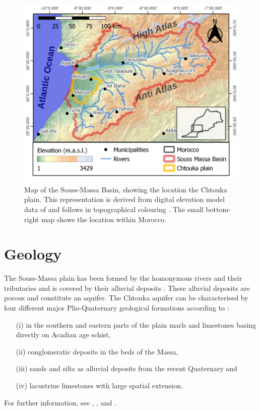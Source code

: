 \begin{figure}[p]
    \centering
    \includegraphics[width=1.0\textwidth]{./img/Map_SoussMassa.pdf}
    \caption{Map of the Souss-Massa Basin, showing the location the Chtouka plain. This representation is derived from digital elevation model data of \textcite{NASA.SRTM1Arc} and follows in topographical colouring \textcite{Hssaisoune.2017}. The small bottom-right map shows the location within Morocco.}
    \label{Map-SoussMassaRegion}
\end{figure}

\section{Geology}
\label{Sec-SouMaGeology}

The Souss-Massa plain has been formed by the homonymous rivers and their tributaries and is covered by their alluvial deposits \parencite{Hssaisoune.2017}. 
These alluvial deposits are porous and constitute an aquifer. 
The Chtouka aquifer can be characterised by four different major Plio-Quaternary geological formations according to \textcite{Malki.2017}: 
    \begin{itemize}
        \item[(i)] in the southern and eastern parts of the plain marls and limestones basing directly on Acadian age schist, 
        \item[(ii)] conglomeratic deposits in the beds of the Massa, 
        \item[(iii)] sands and silts as alluvial deposits from the recent Quaternary and
        \item[(iv)] lacustrine limestones with large spatial extension.
    \end{itemize}
For further information, see \cite{Choubert.1964}, \cite{Hssaisoune.2017}, \cite{Horn.2021} and \cite{Krimissa.2004}.

